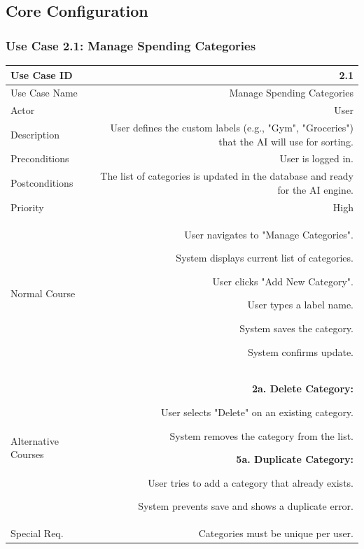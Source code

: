 \documentclass[11pt,a4paper]{report}
\begin{document}
\subsection{Core Configuration}

\subsubsection{Use Case 2.1: Manage Spending Categories}
\begin{tabularx}{\textwidth}{|L|R|}
	\hline
	Use Case ID & 2.1 \\ \hline
	Use Case Name & Manage Spending Categories \\ \hline
	Actor & User \\ \hline
	Description & User defines the custom labels (e.g., "Gym", "Groceries") that the AI will use for sorting. \\ \hline
	Preconditions & User is logged in. \\ \hline
	Postconditions & The list of categories is updated in the database and ready for the AI engine. \\ \hline
	Priority & High \\ \hline
	Normal Course & 
	\begin{normalsteps}
		\item User navigates to "Manage Categories".
		\item System displays current list of categories.
		\item User clicks "Add New Category".
		\item User types a label name.
		\item System saves the category.
		\item System confirms update.
	\end{normalsteps} \\ \hline
	Alternative Courses & 
	\textbf{2a. Delete Category:} 
	\begin{altsteps}
		\item User selects "Delete" on an existing category.
		\item System removes the category from the list.
	\end{altsteps}
	\textbf{5a. Duplicate Category:} 
	\begin{altsteps}
		\item User tries to add a category that already exists.
		\item System prevents save and shows a duplicate error.
	\end{altsteps} \\ \hline
	Special Req. & Categories must be unique per user. \\ \hline
\end{tabularx}
\end{document}
